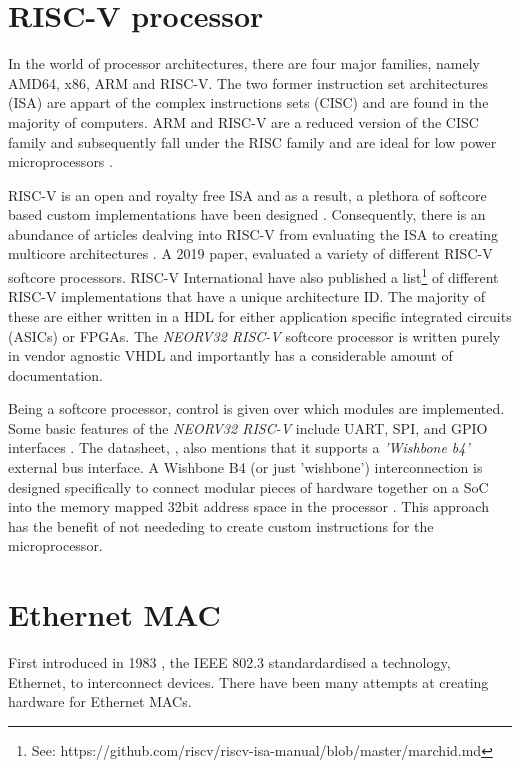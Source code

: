 \section{RISC-V processor}
In the world of processor architectures, there are four major families, namely AMD64, x86, ARM and RISC-V. The two former instruction set architectures (ISA) 
are appart of the complex instructions sets (CISC) and are found in the majority of computers. ARM and RISC-V are a reduced version of the CISC family and 
subsequently fall under the RISC family and are ideal for low power microprocessors \cite{RV16Embedded}.

RISC-V is an open and royalty free ISA and as a result, a plethora of softcore based custom implementations have been designed \cite{CatalogRISCSoftcore}. 
Consequently, there is an abundance of articles dealving into RISC-V from evaluating the ISA \cite{InvestigatingRiscv} to creating multicore architectures
\cite{RiscVMulticore}. A 2019 paper, \cite{CatalogRISCSoftcore} evaluated a variety of different RISC-V softcore processors. RISC-V International have 
also published a list\footnote[1]{See: https://github.com/riscv/riscv-isa-manual/blob/master/marchid.md} of different RISC-V implementations 
that have a unique architecture ID. The majority of these are either written in a HDL for either application specific integrated circuits (ASICs) or FPGAs.
The \textit{NEORV32 RISC-V} softcore processor is written purely in vendor agnostic VHDL and importantly has a considerable amount of documentation. 

Being a softcore processor, control is given over which modules are implemented. Some basic features of the \textit{NEORV32 RISC-V} include 
UART, SPI, and GPIO interfaces \cite{neorv32Datasheet}. The datasheet, \cite{neorv32Datasheet}, also mentions that it supports a \textit{'Wishbone b4'} 
external bus interface. A Wishbone B4 (or just 'wishbone') interconnection is designed specifically to connect modular pieces of hardware together on a 
SoC into the memory mapped 32bit address space in the processor \cite{WishboneSpec}. This approach has the benefit of not neededing to create custom 
instructions for the microprocessor. 



\section{Ethernet MAC}

First introduced in 1983 \cite{IEEE802.3-2012}, the IEEE 802.3 standardardised a technology, Ethernet, to interconnect devices. There have been 
many attempts at creating hardware for Ethernet MACs. 

